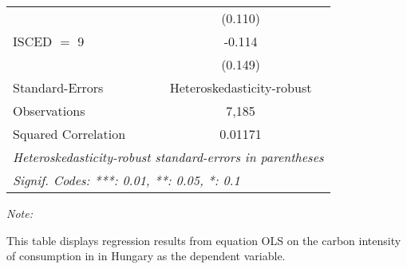 \begin{table}[htbp!]
\begin{adjustbox}{width = 1\textwidth, max height = 0.95\textheight, center}
\begin{threeparttable}[b]
\begin{tabular}{lc}
                                & (0.110)\\   
            ISCED $=$ 9         & -0.114\\   
                                & (0.149)\\   
            \midrule 
            Standard-Errors     & Heteroskedasticity-robust \\   
            Observations        & 7,185\\  
            Squared Correlation & 0.01171\\  
            \midrule \midrule
            \multicolumn{2}{l}{\emph{Heteroskedasticity-robust standard-errors in parentheses}}\\
            \multicolumn{2}{l}{\emph{Signif. Codes: ***: 0.01, **: 0.05, *: 0.1}}\\
         \end{tabular}
         
         \begin{tablenotes}\item \medskip \textit{Note:}
            \item This table displays regression results from equation OLS on the carbon intensity of consumption in  in Hungary as the dependent variable. 
         \end{tablenotes}
      \end{threeparttable}
   \end{adjustbox}
\end{table}


